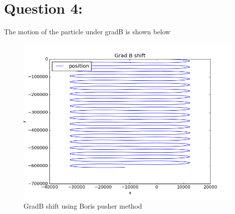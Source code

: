 \documentclass[11pt, a4paper]{article}
\begin{document}
\section{Question 4:}
The motion of the particle under gradB is shown below
\begin{figure}[H]
 \centering
 \includegraphics[scale = 0.5]{GradB_boris.png}
 \caption{GradB shift using Boris pusher method}
\end{figure}
\end{document}

